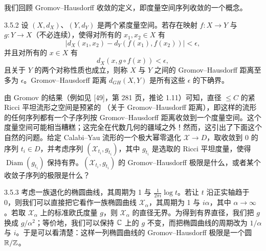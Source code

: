 
我们回顾 Gromov--Hausdorff 收敛的定义，即度量空间序列收敛的一个概念。

\begin{definition}{3.5.2}
设 $(X,d_X)$、$(Y,d_Y)$ 是两个紧度量空间。若存在映射 $f:X\to Y$ 与 $g:Y\to X$（不必连续），使得对所有的 $x_1,x_2\in X$ 有
\[
|d_X(x_1,x_2)-d_Y(f(x_1),f(x_2))|<\epsilon,
\]
并且对所有的 $x\in X$ 有
\[
d_X(x,g\circ f(x))<\epsilon,
\]
且关于 $Y$ 的两个对称性质也成立，则称 $X$ 与 $Y$ 之间的 Gromov--Hausdorff 距离至多为 $\epsilon$。Gromov--Hausdorff 距离 $d_{GH}(X,Y)$ 是所有这些 $\epsilon$ 的下确界。
\end{definition}


由 Gromov 的结果（例如见 [49]，第 281 页，推论 1.11）可知，直径 $\le C$ 的紧 Ricci 平坦流形之空间是预紧的
（关于 Gromov--Hausdorff 距离），即这样的流形的任何序列都有一个子序列按 Gromov--Hausdorff 距离收敛到一个度量空间。这个度量空间可能相当糟糕；这完全在代数几何的疆域之外！然而，这引出了下面这个自然的问题。给定 Calabi--Yau 流形的一个极大幂零退化 $\mathcal{X}\to D$，取收敛到 0 的序列 $t_i\in D$，并考虑序列 $(\mathcal{X}_{t_i},g_{t_i})$，其中 $g_{t_i}$ 是选取的 Ricci 平坦度量，使得 $\operatorname{Diam}(g_{t_i})$ 保持有界。$(\mathcal{X}_{t_i},g_{t_i})$ 的 Gromov--Hausdorff 极限是什么，或者某个收敛子序列的极限是什么？

\begin{example}{3.5.3}
考虑一族退化的椭圆曲线，其周期为 1 与 $\frac{1}{2\pi i}\log t$。若让 $t$ 沿正实轴趋于 0，则我们可以直接把它看作一族椭圆曲线 $\mathcal{X}_\alpha$，其周期为 1 与 $i\alpha$，其中 $\alpha\to\infty$。若取 $\mathcal{X}_\alpha$ 上的标准欧氏度量 $g$，则 $\mathcal{X}_\alpha$ 的直径无界。为得到有界直径，我们把 $g$ 换成 $g/\alpha^2$；等价地，我们可以保持 $\mathbb{C}$ 上的 $g$ 不变，而把椭圆曲线的周期改为 $1/\alpha$ 与 $i$。于是可以看清楚：这样一列椭圆曲线的 Gromov--Hausdorff 极限是一个圆 $\mathbb{R}/\mathbb{Z}$。
\end{example}


